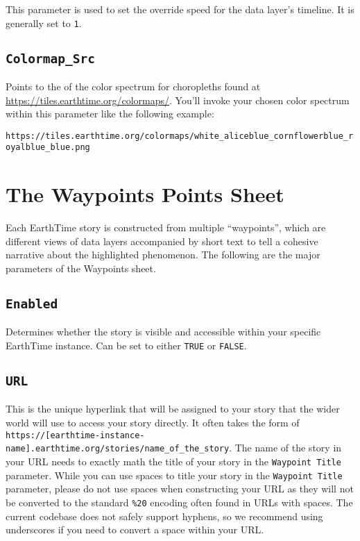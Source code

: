 \documentclass[
]{krantz}
\begin{document}
This parameter is used to set the override speed for the data layer's timeline. It is generally set to \texttt{1}.

\hypertarget{colormap_src}{%
\subsection*{\texorpdfstring{\texttt{Colormap\_Src}}{Colormap\_Src}}\label{colormap_src}}


Points to the of the color spectrum for choropleths found at \url{https://tiles.earthtime.org/colormaps/}. You'll invoke your chosen color spectrum within this parameter like the following example:

\texttt{https://tiles.earthtime.org/colormaps/white\_aliceblue\_cornflowerblue\_royalblue\_blue.png}

\hypertarget{the-waypoints-points-sheet}{%
\section{The Waypoints Points Sheet}\label{the-waypoints-points-sheet}}

Each EarthTime story is constructed from multiple ``waypoints'', which are different views of data layers accompanied by short text to tell a cohesive narrative about the highlighted phenomenon. The following are the major parameters of the Waypoints sheet.

\hypertarget{enabled-1}{%
\subsection*{\texorpdfstring{\texttt{Enabled}}{Enabled}}\label{enabled-1}}


Determines whether the story is visible and accessible within your specific EarthTime instance. Can be set to either \texttt{TRUE} or \texttt{FALSE}.

\hypertarget{url-1}{%
\subsection*{\texorpdfstring{\texttt{URL}}{URL}}\label{url-1}}


This is the unique hyperlink that will be assigned to your story that the wider world will use to access your story directly. It often takes the form of \texttt{https://{[}earthtime-instance-name{]}.earthtime.org/stories/name\_of\_the\_story}. The name of the story in your URL needs to exactly math the title of your story in the \texttt{Waypoint\ Title} parameter. While you can use spaces to title your story in the \texttt{Waypoint\ Title} parameter, please do not use spaces when constructing your URL as they will not be converted to the standard \texttt{\%20} encoding often found in URLs with spaces. The current codebase does not safely support hyphens, so we recommend using underscores if you need to convert a space within your URL.
\end{document}
